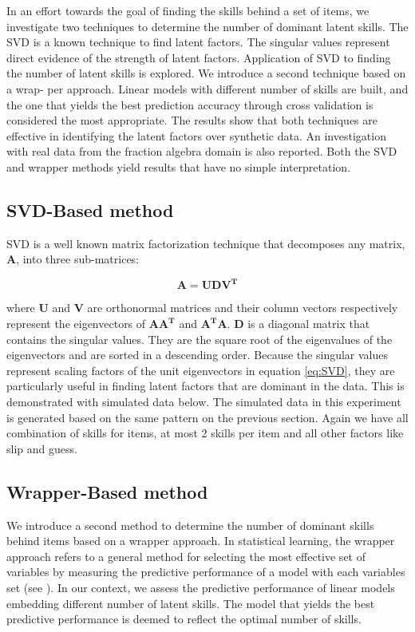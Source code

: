 In an effort towards the goal of finding the skills behind a set of items, we investigate two techniques to determine the number of dominant latent skills. The SVD is a known technique to find latent factors. The singular values represent direct evidence of the strength of latent factors. Application of SVD to finding the number of latent skills is explored. We introduce a second technique based on a wrap- per approach. Linear models with different number of skills are built, and the one that yields the best prediction accuracy through cross validation is considered the most appropriate. The results show that both techniques are effective in identifying the latent factors over synthetic data. An investigation with real data from the fraction algebra domain is also reported. Both the SVD and wrapper methods yield results that have no simple interpretation.


\subsection{SVD-Based method}

SVD is a well known matrix factorization technique that decomposes any matrix, $\mathbf{A}$, into three sub-matrices: 

\begin{equation}
\mathbf{A}=\mathbf{UDV^{T}}\label{eq:SVD}
\end{equation}


where $\mathbf{U}$ and $\mathbf{V}$ are orthonormal matrices and their column vectors respectively represent the eigenvectors of $\mathbf{\mathbf{A}A^{T}}$ and $\mathbf{A^{T}\mathbf{A}}$. $\mathbf{D}$ is a diagonal matrix that contains the singular values. They are the square root of the eigenvalues of the eigenvectors and are sorted in a descending order. Because the singular values represent scaling factors of the unit eigenvectors in equation \ref{eq:SVD}, they are particularly useful in finding latent factors that are dominant in the data. This is demonstrated with simulated data below. The simulated data in this experiment is generated based on the same pattern on the previous section. Again we have all combination of skills for items, at most 2 skills per item and all other factors like slip and guess.


\subsection{Wrapper-Based method}


We introduce a second method to determine the number of dominant skills behind items based on a wrapper approach. In statistical learning, the wrapper approach refers to a general method for selecting the most effective set of variables by measuring the predictive performance of a model with each variables set (see \citep{Guyon2003}). In our context, we assess the predictive performance of linear models embedding different number of latent skills. The model that yields the best predictive performance is deemed to reflect the optimal number of skills.

